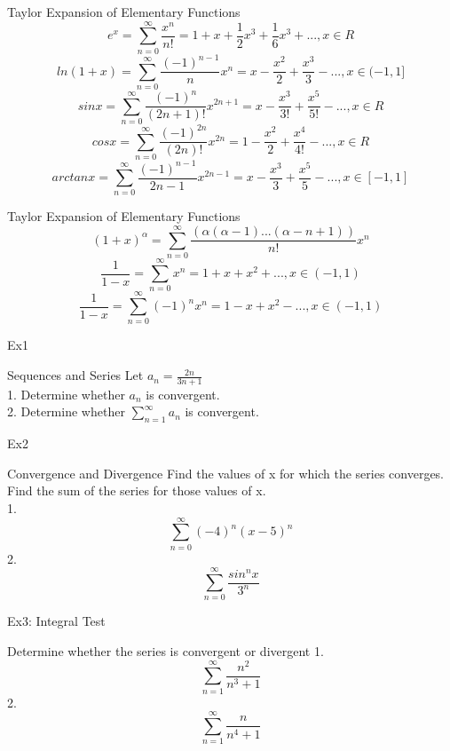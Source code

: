 \begin{frame}{Taylor Expansion of Elementary Functions}
    $$e^x = \sum\limits_{n=0}^{\infty} \frac{x^n}{n!}=1+x+\frac{1}{2}x^3+\frac{1}{6}x^3+...,x \in R$$
    $$ln(1+x)=\sum\limits_{n=0}^{\infty}\frac{(-1)^{n-1}}{n}x^n = x-\frac{x^2}{2}+\frac{x^3}{3}-..., x \in (-1,1]$$
    $$sin x =\sum\limits_{n=0}^{\infty} \frac{(-1)^{n}}{(2n+1)!} x^{2n+1}=x -\frac{x^3}{3!} +\frac{x^5}{5!}-...,x\in R$$
    $$cos x =\sum\limits_{n=0}^{\infty} \frac{(-1)^{2n}}{(2n)!}x^{2n} = 1 - \frac{x^2}{2}+ \frac{x^4}{4!}-...,x\in R$$
    $$arctan x =\sum\limits_{n=0}^{\infty} \frac{(-1)^{n-1}}{2n-1}x^{2n-1} =x -\frac{x^3}{3}+\frac{x^5}{5}-..., x\in [-1,1]$$
\end{frame}


\begin{frame}{Taylor Expansion of Elementary Functions}
    $$(1+x)^\alpha = \sum\limits_{n=0}^{\infty} \frac{(\alpha(\alpha-1)...(\alpha-n+1))}{n!} x^n$$
    $$\frac{1}{1-x}=\sum\limits_{n=0}^{\infty} x^n = 1+x+x^2+...,x\in (-1,1)$$
    $$\frac{1}{1-x}=\sum\limits_{n=0}^{\infty} (-1)^n x^n = 1-x+x^2-...,x\in (-1,1)$$
\end{frame}



\begin{frame}{Ex1}
    \begin{block}{Sequences and Series}
        Let $a_n=\frac{2n}{3n+1}$\\
        1. Determine whether {$a_n$} is convergent.\\
        2. Determine whether $\sum_{n=1}^{\infty} a_n$ is convergent.
    \end{block}
\end{frame}



\begin{frame}{Ex2}
    \begin{block}{Convergence and Divergence}
        Find the values of x for which the series converges. Find the sum of
        the series for those values of x.\\
        1. $$\sum\limits_{n=0}^{\infty}(-4)^n(x-5)^n$$
        2. $$\sum\limits_{n=0}^{\infty}\frac{sin^n x}{3^n}$$
    \end{block}
\end{frame}


\begin{frame}{Ex3: Integral Test}
    \begin{block}{Determine whether the series is convergent or divergent}
        1.$$\sum\limits_{n=1}^{\infty} \frac{n^2}{n^3+1}$$
        2.$$\sum\limits_{n=1}^{\infty} \frac{n}{n^4+1}$$
    \end{block}
\end{frame}


